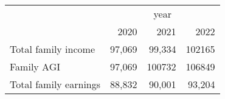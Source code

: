 \documentclass{article}
\begin{document}
\begin{tabular}{llll}
\cline{1-4}
\multicolumn{1}{c}{} &
  \multicolumn{3}{|c}{year} \\
\multicolumn{1}{c}{} &
  \multicolumn{1}{|r}{2020} &
  \multicolumn{1}{r}{2021} &
  \multicolumn{1}{r}{2022} \\
\cline{1-4}
\multicolumn{1}{l}{Total family income} &
  \multicolumn{1}{|r}{97,069} &
  \multicolumn{1}{r}{99,334} &
  \multicolumn{1}{r}{102165} \\
\multicolumn{1}{l}{Family AGI} &
  \multicolumn{1}{|r}{97,069} &
  \multicolumn{1}{r}{100732} &
  \multicolumn{1}{r}{106849} \\
\multicolumn{1}{l}{Total family earnings} &
  \multicolumn{1}{|r}{88,832} &
  \multicolumn{1}{r}{90,001} &
  \multicolumn{1}{r}{93,204} \\
\cline{1-4}
\end{tabular}
\end{document}
